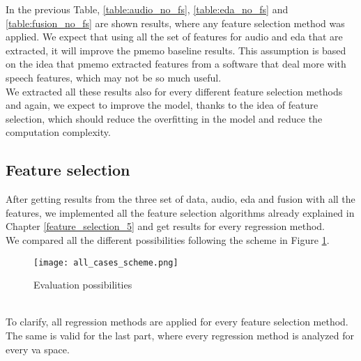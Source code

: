 \newpage
In the previous Table, \ref{table:audio_no_fs}, \ref{table:eda_no_fs} and \ref{table:fusion_no_fs} are shown results, where any feature selection method was applied. We expect that using all the set of features for audio and \gls{eda} that are extracted, it will improve the \gls{pmemo} baseline results. This assumption is based on the idea that \gls{pmemo} extracted features from a software that deal more with speech features, which may not be so much useful.
\\ \indent
We extracted all these results also for every different feature selection methods and again, we expect to improve the model, thanks to the idea of feature selection, which should reduce the overfitting in the model and reduce the computation complexity.

\subsection{Feature selection}
After getting results from the three set of data, audio, \gls{eda} and fusion with all the features, we implemented all the feature selection algorithms already explained in Chapter \ref{feature_selection_5} and get results for every regression method.
\\ \indent
We compared all the different possibilities following the scheme in Figure \ref{fig:all_cases_scheme}.
\begin{figure}[h]
    \centering
    \texttt{[image: all\_cases\_scheme.png]} 
	\caption{Evaluation possibilities}
    \label{fig:all_cases_scheme}
\end{figure}
\\
To clarify, all regression methods are applied for every feature selection method. The same is valid for the last part, where every regression method is analyzed for every \gls{va} space.

